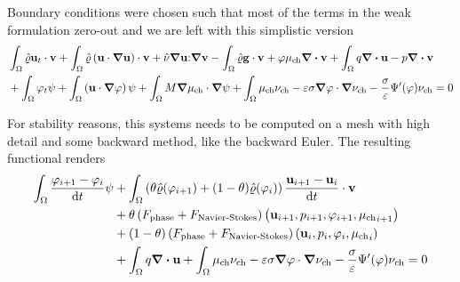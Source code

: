 Boundary conditions were chosen such that most of the terms in the weak formulation zero-out and we are left with this simplistic version
\begin{align*}
    &\int_{\Omega} \density \velocity_t \cdot \test{\velocity} + \int_{\Omega} \density \left(\velocity \cdot \grad{\velocity} \right) \cdot \test{\velocity} + \viscosity \grad{\velocity} \mathbf{:} \grad{\test{\velocity}} - \int_{\Omega} \density \gravity \cdot \test{\velocity} + \phase \chempot \div{\test{\velocity}} + \int_{\Omega} \test{\pressure} \div{\velocity} - \pressure \div{\test{\velocity}} \\
    & + \int_{\Omega} \phase_t \test{\phase} + \int_{\Omega} \left(\velocity \cdot \grad{\phase}\right) \test{\phase} + \int_{\Omega} M \grad{\chempot} \cdot \grad{\test{\phase}} + \int_{\Omega} \chempot \test{\chempot} - \varepsilon \sigma \grad{\phase} \cdot \grad{\test{\chempot}} - \frac{\sigma}{\varepsilon} \potential'(\phase) \test{\chempot} = 0
\end{align*}


For stability reasons, this systems needs to be computed on a mesh with high detail and some backward method, like the backward Euler. The resulting functional renders
\begin{align*}
    \int_{\Omega} \frac{\phase_{i + 1} - \phase_i}{\dd{t}} \test{\phase} &+ \int_{\Omega} \left(\theta \density(\phase_{i + 1}) + (1 - \theta) \density(\phase_i)\right) \frac{\velocity_{i+1} - \velocity_i}{\dd{t}} \cdot \test{\velocity} \\
    &+ \theta\left(F_{\text{phase}} + F_{\text{Navier-Stokes}}\right)\left(\velocity_{i+1}, \pressure_{i+1}, \phase_{i+1}, {\chempot}_{i+1}\right)\\
    &+ (1 - \theta)\left(F_{\text{phase}} + F_{\text{Navier-Stokes}}\right)\left(\velocity_{i}, \pressure_{i}, \phase_{i}, {\chempot}_{i}\right) \\
    &+ \int_{\Omega} {\test{\pressure}} \div{\velocity} + \int_{\Omega} \chempot \test{\chempot} - \varepsilon \sigma \grad{\phase} \cdot \grad{\test{\chempot}} - \frac{\sigma}{\varepsilon} \potential'(\phase) \test{\chempot} = 0
\end{align*}


